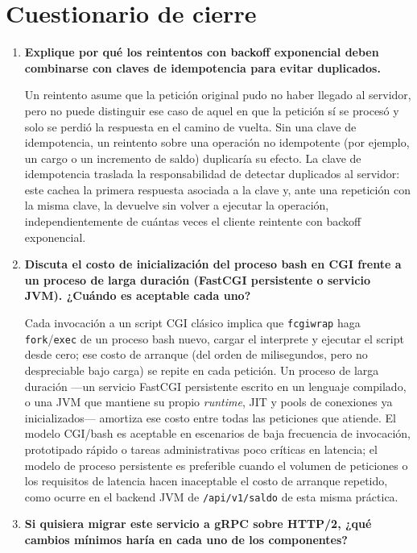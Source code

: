 \section{Cuestionario de cierre}

\begin{enumerate}[label=\arabic*.]

\item \textbf{Explique por qué los reintentos con backoff exponencial deben combinarse con claves de idempotencia para evitar duplicados.}

Un reintento asume que la petición original pudo no haber llegado al servidor, pero no puede distinguir ese caso de aquel en que la petición sí se procesó y solo se perdió la respuesta en el camino de vuelta. Sin una clave de idempotencia, un reintento sobre una operación no idempotente (por ejemplo, un cargo o un incremento de saldo) duplicaría su efecto. La clave de idempotencia traslada la responsabilidad de detectar duplicados al servidor: este cachea la primera respuesta asociada a la clave y, ante una repetición con la misma clave, la devuelve sin volver a ejecutar la operación, independientemente de cuántas veces el cliente reintente con backoff exponencial.

\item \textbf{Discuta el costo de inicialización del proceso bash en CGI frente a un proceso de larga duración (FastCGI persistente o servicio JVM). ¿Cuándo es aceptable cada uno?}

Cada invocación a un script CGI clásico implica que \texttt{fcgiwrap} haga \texttt{fork}/\texttt{exec} de un proceso bash nuevo, cargar el interprete y ejecutar el script desde cero; ese costo de arranque (del orden de milisegundos, pero no despreciable bajo carga) se repite en cada petición. Un proceso de larga duración —un servicio FastCGI persistente escrito en un lenguaje compilado, o una JVM que mantiene su propio \emph{runtime}, JIT y pools de conexiones ya inicializados— amortiza ese costo entre todas las peticiones que atiende. El modelo CGI/bash es aceptable en escenarios de baja frecuencia de invocación, prototipado rápido o tareas administrativas poco críticas en latencia; el modelo de proceso persistente es preferible cuando el volumen de peticiones o los requisitos de latencia hacen inaceptable el costo de arranque repetido, como ocurre en el backend JVM de \texttt{/api/v1/saldo} de esta misma práctica.

\item \textbf{Si quisiera migrar este servicio a gRPC sobre HTTP/2, ¿qué cambios mínimos haría en cada uno de los componentes?}


\end{enumerate}
